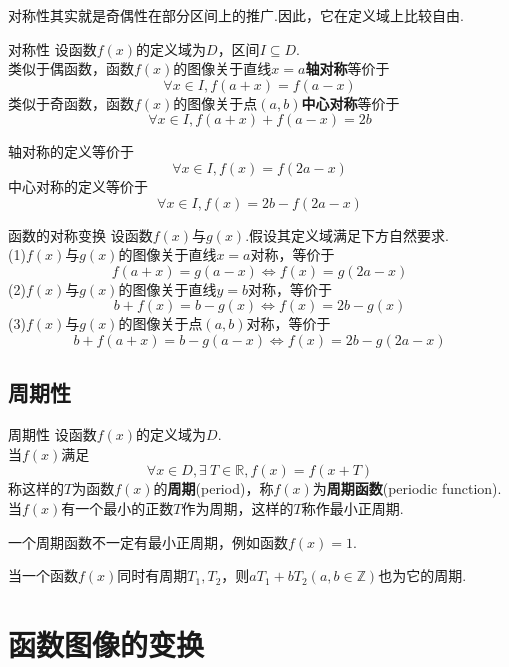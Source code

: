 \documentclass[lang=cn, zihao=4.5]{elegantbook}
\begin{document}
对称性其实就是奇偶性在部分区间上的推广.因此，它在定义域上比较自由.

\begin{definition}{对称性} %
    设函数$f(x)$的定义域为$D$，区间$I \subseteq D$.\\
    类似于偶函数，函数$f(x)$的图像关于直线$x=a$\textbf{轴对称}等价于
    $$ \forall x \in I, f(a+x)=f(a-x) $$
    类似于奇函数，函数$f(x)$的图像关于点$(a,b)$\textbf{中心对称}等价于
    $$ \forall x \in I, f(a+x)+f(a-x)=2b $$
\end{definition}
\begin{remark}
    轴对称的定义等价于$$\forall x \in I, f(x)=f(2a-x)$$
    中心对称的定义等价于$$\forall x \in I, f(x)=2b-f(2a-x)$$
\end{remark}

\begin{proposition}{函数的对称变换}
    设函数$f(x)$与$g(x)$.假设其定义域满足下方自然要求.\\
    (1)$f(x)$与$g(x)$的图像关于直线$x=a$对称，等价于$$f(a+x)=g(a-x) \Longleftrightarrow f(x)=g(2a-x)$$
    (2)$f(x)$与$g(x)$的图像关于直线$y=b$对称，等价于$$b+f(x)=b-g(x) \Longleftrightarrow f(x)=2b-g(x)$$
    (3)$f(x)$与$g(x)$的图像关于点$(a,b)$对称，等价于$$b+f(a+x)=b-g(a-x) \Longleftrightarrow f(x)=2b-g(2a-x)$$
\end{proposition}

\subsection{周期性}

\begin{definition}{周期性} %
    设函数$f(x)$的定义域为$D$.\\
    当$f(x)$满足$$\forall x \in D, \exists \ T \in \mathbb{R}, f(x)=f(x+T)$$
    称这样的$T$为函数$f(x)$的\textbf{周期}(period)，称$f(x)$为\textbf{周期函数}(periodic function).当$f(x)$有一个最小的正数$T$作为周期，这样的$T$称作最小正周期.
\end{definition}

\begin{remark}
    一个周期函数不一定有最小正周期，例如函数$f(x)=1$.
\end{remark}
\begin{remark}
    当一个函数$f(x)$同时有周期$T_1,T_2$，则$aT_1+bT_2(a,b \in \mathbb{Z})$也为它的周期.
\end{remark}

\section{函数图像的变换}
\end{document}
